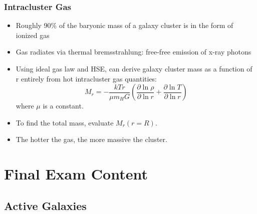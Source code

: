 \documentclass{book}
\begin{document}
\subsection{Intracluster Gas}
\begin{itemize}
    \item Roughly 90\% of the baryonic mass of a galaxy cluster is in the form of ionized gas
    \item Gas radiates via thermal bremsstrahlung: free-free emission of x-ray photons
    \item Using ideal gas law and HSE, can derive galaxy cluster mass as a function of r entirely from hot intracluster gas quantities: $$M_r = - \frac{k T r}{\mu m_H G} \left( \frac{\partial \ln \rho}{\partial \ln r} + \frac{\partial \ln T}{\partial \ln r}\right)$$ where $\mu$ is a constant.
    \item To find the total mass, evaluate $M_r (r = R)$.
    \item The hotter the gas, the more massive the cluster.
\end{itemize}
\chapter{Final Exam Content}
\section{Active Galaxies}
\end{document}
